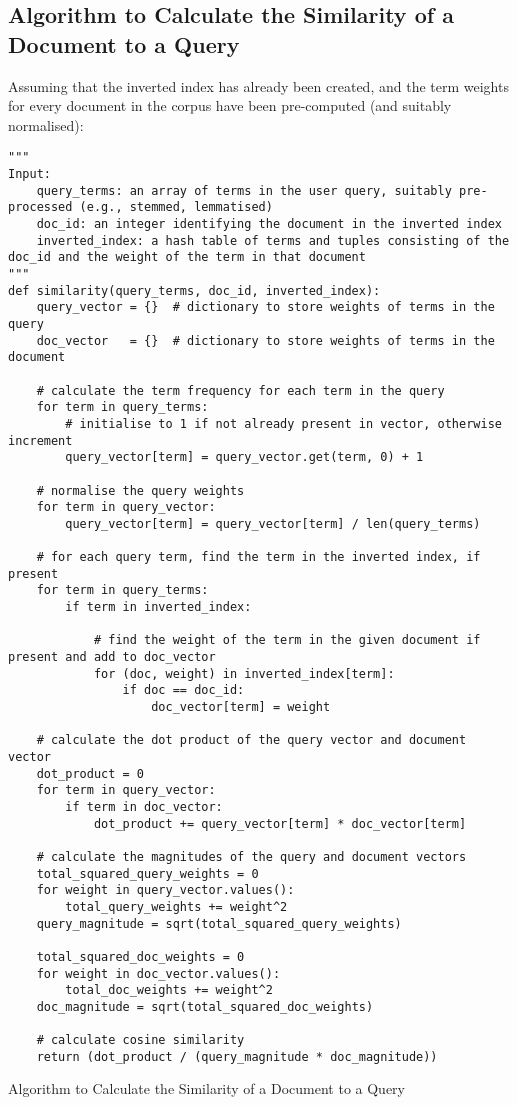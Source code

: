 \documentclass[a4paper]{article}
\newenvironment{code}{\captionsetup{type=listing}}{}
\begin{document}
\subsection{Algorithm to Calculate the Similarity of a Document to a Query}
Assuming that the inverted index has already been created, and the term weights for every document in the corpus have been pre-computed (and suitably normalised):

\begin{code}
%
\begin{verbatim}
"""
Input: 
    query_terms: an array of terms in the user query, suitably pre-processed (e.g., stemmed, lemmatised)
    doc_id: an integer identifying the document in the inverted index
    inverted_index: a hash table of terms and tuples consisting of the doc_id and the weight of the term in that document
"""
def similarity(query_terms, doc_id, inverted_index):
    query_vector = {}  # dictionary to store weights of terms in the query
    doc_vector   = {}  # dictionary to store weights of terms in the document

    # calculate the term frequency for each term in the query
    for term in query_terms:
        # initialise to 1 if not already present in vector, otherwise increment
        query_vector[term] = query_vector.get(term, 0) + 1

    # normalise the query weights
    for term in query_vector:
        query_vector[term] = query_vector[term] / len(query_terms)

    # for each query term, find the term in the inverted index, if present
    for term in query_terms:
        if term in inverted_index:

            # find the weight of the term in the given document if present and add to doc_vector
            for (doc, weight) in inverted_index[term]:
                if doc == doc_id:
                    doc_vector[term] = weight

    # calculate the dot product of the query vector and document vector
    dot_product = 0
    for term in query_vector:
        if term in doc_vector:
            dot_product += query_vector[term] * doc_vector[term]

    # calculate the magnitudes of the query and document vectors
    total_squared_query_weights = 0
    for weight in query_vector.values():
        total_query_weights += weight^2
    query_magnitude = sqrt(total_squared_query_weights)

    total_squared_doc_weights = 0
    for weight in doc_vector.values():
        total_doc_weights += weight^2
    doc_magnitude = sqrt(total_squared_doc_weights)

    # calculate cosine similarity
    return (dot_product / (query_magnitude * doc_magnitude))
\end{verbatim}
\caption{Algorithm to Calculate the Similarity of a Document to a Query}
\end{code}
\end{document}
